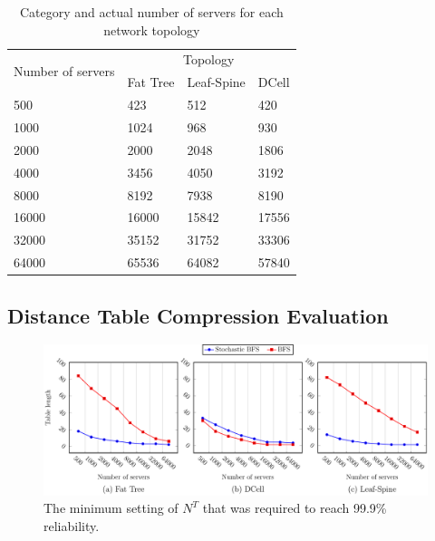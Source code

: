 \begin{table}[t]
    \caption{Category and actual number of servers for each network topology}
    \label{tbl:scales}

    \centering
    \begin{tabularx}{\linewidth}{lXXX}
        \toprule
        \multirow{2}{6em}{Number of servers} & \multicolumn{3}{c}{Topology}                      \\
        \cmidrule{2-4}
                                             & Fat Tree                     & Leaf-Spine & DCell \\
        \midrule
        500                                  & 423                          & 512        & 420   \\
        1000                                 & 1024                         & 968        & 930   \\
        2000                                 & 2000                         & 2048       & 1806  \\
        4000                                 & 3456                         & 4050       & 3192  \\
        8000                                 & 8192                         & 7938       & 8190  \\
        16000                                & 16000                        & 15842      & 17556 \\
        32000                                & 35152                        & 31752      & 33306 \\
        64000                                & 65536                        & 64082      & 57840 \\
        \bottomrule
    \end{tabularx}
\end{table}

\subsection{Distance Table Compression Evaluation}
\label{sec:distance_compression}

\begin{figure}[t!]
    \centering
    \includegraphics[width=\linewidth]{figures/graphs/distance_table/distance_tables}

    \caption{The minimum setting of $N^T$ that was required to reach 99.9\% reliability.}
    \label{fig:distance_compression_alpha}
\end{figure}

